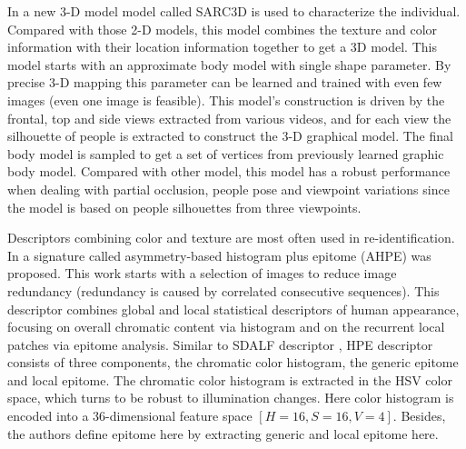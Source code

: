 In \cite{SARC3D} a new 3-D model model called SARC3D  is used to characterize the individual. Compared with those 2-D models, this model combines the texture and color information with their location information together to get a 3D model. This model starts with an approximate body model with single shape parameter. By precise 3-D mapping this parameter can be learned and trained with even few images (even one image is feasible). This model's construction is driven by the frontal, top and side views extracted from various videos, and for each view the silhouette of people is extracted to construct the 3-D graphical model. The final body model is sampled to get a set of vertices from previously learned graphic body model. Compared with other model, this model has a robust performance when dealing with partial occlusion, people pose and viewpoint variations since the model is based on people silhouettes from three viewpoints.

Descriptors combining color and texture are most often used in re-identification. In \cite{AHPE} a signature called asymmetry-based histogram plus epitome (AHPE) was proposed. This work starts with a selection of images to reduce image redundancy (redundancy is caused by correlated consecutive sequences). This descriptor combines global and local statistical descriptors of human appearance, focusing on overall chromatic content via histogram and on the recurrent local patches via epitome analysis. Similar to SDALF descriptor \cite{SDALF}, HPE descriptor consists of three components, the chromatic color histogram, the generic epitome and local epitome. The chromatic color histogram is extracted in the HSV color space, which turns to be robust to illumination changes. Here color histogram is encoded into a 36-dimensional feature space $[H=16,  S=16,  V=4]$. Besides, the authors define epitome here by extracting generic and local epitome here. 


